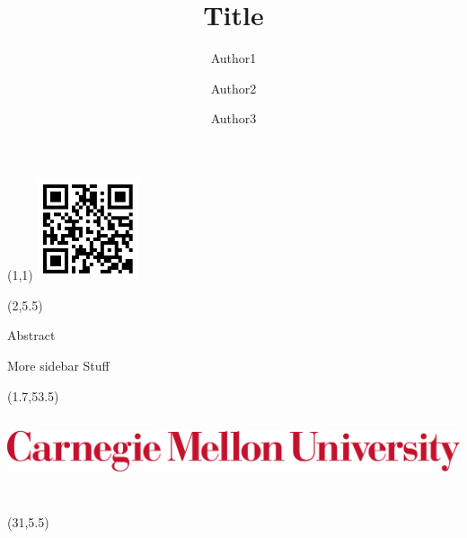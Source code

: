 \documentclass[final]{beamer}
\title{Title}
\author{Author1 \and Author2 \and Author3}
\date{}
\theoremstyle{definition}
\begin{document}
\begin{frame}[fragile]


\begin{textblock}{10}(1,1)
\includegraphics[height=3cm]{images/qr.png}
\end{textblock}


\begin{textblock}{27}(2,5.5)

\begin{block}{Abstract}
\end{block}

\begin{block}{More sidebar Stuff}
\end{block}

\end{textblock}


\begin{textblock}{23}(1.7,53.5)
\includegraphics[height=2.7cm,width=27cm]{images/cmuh.png}
\end{textblock}


\begin{textblock}{51}(31,5.5)


\end{textblock}
\end{frame}
\end{document}
